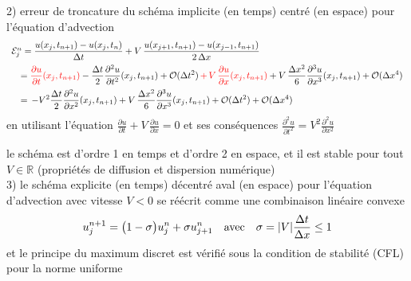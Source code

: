\documentclass[12pt,a4paper]{article}
\begin{document}
2) erreur de troncature du sch\'ema implicite (en temps) centr\'e (en espace) pour l'\'equation d'advection
$$
\begin{array}{l}
{\cal E}^n_j = \displaystyle \frac{u(x_j,t_{n+1}) - u(x_j,t_n)}{\Delta t} 
+ V\,\frac{u(x_{j+1},t_{n+1})-u(x_{j-1},t_{n+1})}{2\,\Delta x} \\[2ex]
  \quad = \displaystyle \textcolor{red}{ \frac{\partial u}{\partial t}(x_j,t_{n+1}) } - \frac{\Delta t}{2}
\frac{\partial^2 u}{\partial t^2}(x_j,t_{n+1}) + {\cal O}(\Delta t^2) \textcolor{red}{ \,+\, V\,\frac{\partial u}{\partial
  x}(x_j,t_{n+1}) } + V\,\frac{\Delta x^2}{6}\frac{\partial^3 u}{\partial
  x^3}(x_j,t_{n+1}) + {\cal O}(\Delta x^4) \\[2ex]
    \quad =\, \displaystyle - V^2 \frac{\Delta t}{2}
\frac{\partial^2 u}{\partial x^2}(x_j,t_{n+1}) + V\,\frac{\Delta x^2}{6}\frac{\partial^3 u}{\partial
  x^3}(x_j,t_{n+1}) + {\cal O}(\Delta t^2) + {\cal O}(\Delta x^4)
\end{array}
$$
en utilisant l'\'equation $\displaystyle \frac{\partial u}{\partial t} + V \,\frac{\partial u}{\partial x}=0$ et ses cons\'equences $\displaystyle \frac{\partial^2 u}{\partial t^2} = V^2 \frac{\partial^2 u}{\partial x^2}$

le sch\'ema est d'ordre 1 en temps et d'ordre 2 en espace, et il est stable pour tout $V\in \mathbb{R}$ (propri\'et\'es de diffusion et dispersion num\'erique)\\


3) le sch\'ema explicite (en temps) d\'ecentr\'e aval (en espace) pour l'\'equation d'advection avec vitesse $V<0$ se r\'e\'ecrit comme une combinaison lin\'eaire convexe
$$ u_j^{n+1} = \big( 1 - \sigma \big) u_j^n + \sigma u_{j+1}^n \quad {\rm avec} \quad \sigma = |V| \frac{\Delta t}{\Delta x} \leq 1 $$
et le principe du maximum discret est v\'erifi\'e sous la condition de stabilit\'e (CFL) pour la norme uniforme\\

\end{document}
